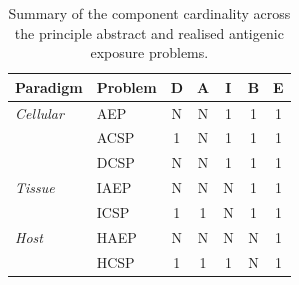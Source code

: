 \begin{table}[htp]
	\centering\small
		\begin{tabular}{llccccc}
		\toprule
		\textbf{Paradigm} & \textbf{Problem} & \textbf{D} & \textbf{A} & \textbf{I} & \textbf{B} & \textbf{E} \\ 
		\toprule
		\emph{Cellular} & AEP 	& N & N & 1 & 1 & 1 \\ 
									  & ACSP 	& 1 & N & 1 & 1 & 1 \\ 
									  & DCSP 	& N & N & 1 & 1 & 1 \\
		\midrule
		\emph{Tissue} & IAEP 		& N & N & N & 1 & 1 \\ 
									& ICSP 		& 1 & 1 & N & 1 & 1 \\ 
		\midrule
		\emph{Host} & HAEP 			& N & N & N & N & 1 \\ 
								& HCSP 			& 1 & 1 & 1 & N & 1 \\ 
		\bottomrule
		\end{tabular}	
	\caption{Summary of the component cardinality across the principle abstract and realised antigenic exposure problems.}
	\label{tab:framework:haef:bracketing:cardinality}
\end{table}

